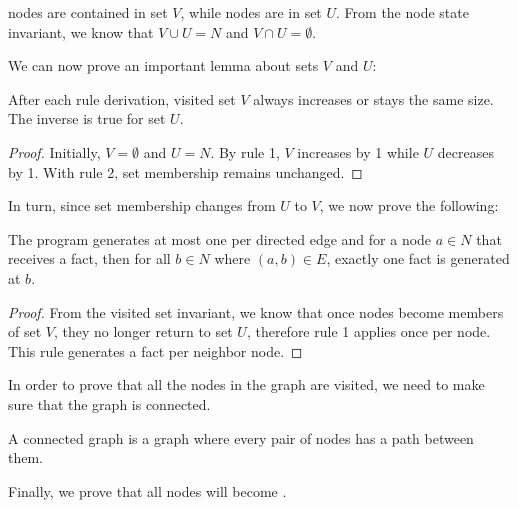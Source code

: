 \begin{definition}  nodes are contained in set $V$,
while  nodes are in set $U$. From the node state invariant, we
know that $V \cup U = N$ and $V \cap U = \emptyset$.
\end{definition}

We can now prove an important lemma about sets $V$ and $U$:

\begin{invariant}

After each rule derivation, visited set $V$ always increases or stays the same
size. The inverse is true for set $U$.

\end{invariant}
\begin{proof}
Initially, $V = \emptyset$ and $U = N$.
By rule 1, $V$ increases by 1 while $U$ decreases by 1. With rule 2, set
membership remains unchanged.
\end{proof}

In turn, since set membership changes from $U$ to $V$, we now prove the
following:

\begin{lemma}\label{lemma:language:edge_visits}
The program generates at most one  per directed edge and for a node
$a \in N$ that receives a  fact, then for all $b \in N$ where $(a,
b) \in E$, exactly one  fact is generated at $b$.
\end{lemma}
\begin{proof}
From the visited set invariant, we know that once nodes become members of set $V$,
they no longer return to set $U$, therefore rule 1 applies once per
node. This rule generates a  fact per neighbor node.
\end{proof}

In order to prove that all the nodes in the graph are visited, we need to make
sure that the graph is connected.

\begin{definition}
A connected graph is a graph where every pair of nodes has a path between them.
\end{definition}

Finally, we prove that all nodes will become .

